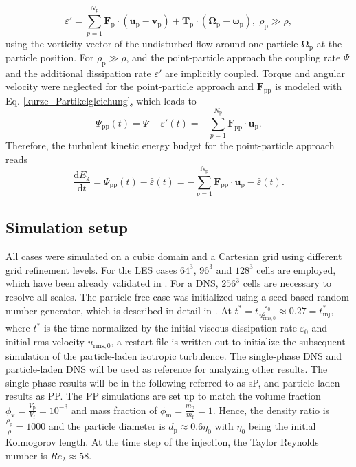 \documentclass[11pt,a4paper,openany,oneside,parskip=half*]{article}
\renewcommand*\vec[1]{\boldsymbol{#1}}
\begin{document}
\begin{equation}
	\varepsilon' = \sum_{p=1}^{N_\mathrm{p}} \vec{F}_\mathrm{p} \cdot (\vec{u}_\mathrm{p}-\vec{v}_\mathrm{p})+ \vec{T}_\mathrm{p} \cdot (\vec{\Omega}_\mathrm{p} - \vec{\omega}_\mathrm{p}), \; \rho_\mathrm{p} \gg \rho,
\end{equation}
using the vorticity vector of the undisturbed flow around one particle $\vec{\Omega}_\mathrm{p}$ at the particle position.
\newline
For $\rho_\mathrm{p} \gg \rho$, and the point-particle approach the coupling rate $\Psi$ and the additional dissipation rate $\varepsilon'$ are implicitly coupled. Torque and angular velocity were neglected for the point-particle approach and $\vec{F}_\mathrm{pp}$ is modeled with Eq. \ref{kurze_Partikelgleichung}, which leads to
\begin{equation}
\Psi_\mathrm{pp} (t) = \Psi - \varepsilon'(t) = - \sum_{p=1}^{N_\mathrm{p}} \vec{F}_\mathrm{pp} \cdot \vec{u}_\mathrm{p}.
\end{equation}
Therefore, the turbulent kinetic energy budget for the point-particle approach reads
\begin{equation}
\frac{\mathrm{d} E_\mathrm{k}}{\mathrm{d} t} = \Psi_\mathrm{pp} (t) - \bar{\varepsilon} (t) = - \sum_{p=1}^{N_\mathrm{p}} \vec{F}_\mathrm{pp} \cdot \vec{u}_\mathrm{p} - \bar{\varepsilon} (t).
\end{equation}
\newline
\subsection{Simulation setup}
All cases were simulated on a cubic domain and a Cartesian grid using different grid refinement levels. For the LES cases $64^3$, $96^3$ and $128^3$ cells are employed, which have been already validated in \cite{ValidationOfParticleLadenLargeEddySimulationUsingHPCSystems}. For a DNS, $256^3$ cells are necessary to resolve all scales.
\newline
The particle-free case was initialized using a seed-based random number generator, which is described in detail in \cite{orszag1969numerical}. At $t^*=t\frac{\varepsilon_\mathrm{0}}{u_\mathrm{rms,0}^2} \approx 0.27=t_\mathrm{inj}^*$, where $t^*$ is the time normalized by the initial viscous dissipation rate $\varepsilon_\mathrm{0}$ and initial rms-velocity $u_\mathrm{rms,0}$, a restart file is written out to initialize the subsequent simulation of the particle-laden isotropic turbulence.
\newline
The single-phase DNS and particle-laden DNS will be used as reference for analyzing other results. The single-phase results will be in the following referred to as sP, and particle-laden results as PP. The PP simulations are set up to match the volume fraction $\phi_\mathrm{v}=\frac{V_\mathrm{p}}{V_\mathrm{f}}= 10^{-3}$ and mass fraction of $\phi_\mathrm{m}=\frac{m_\mathrm{p}}{m_\mathrm{f}}=1$. Hence, the density ratio is $\frac{\rho_\mathrm{p}}{\rho} = 1000$ and the particle diameter is $d_\mathrm{p} \approx 0.6 \eta_\mathrm{0}$ with $\eta_\mathrm{0}$ being the initial Kolmogorov length. At the time step of the injection, the Taylor Reynolds number is $Re_\lambda \approx 58$. 
\newline
\end{document}
